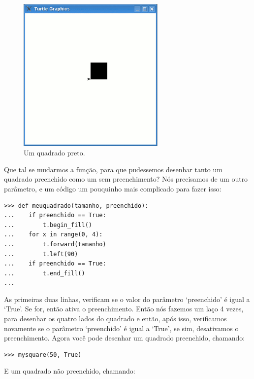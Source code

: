 {\begin{figure}
\begin{center}
\includegraphics[width=72mm]{eps/figure27.eps}
\end{center}
\caption{Um quadrado preto.}\label{fig27}
\end{figure}

Que tal se mudarmos a função, para que pudessemos desenhar tanto um quadrado preenchido como um sem preenchimento? Nós precisamos de um outro parâmetro, e um código um pouquinho mais complicado para fazer isso:

\begin{listing}
\begin{verbatim}
>>> def meuquadrado(tamanho, preenchido):
...    if preenchido == True:
...        t.begin_fill()
...    for x in range(0, 4):
...        t.forward(tamanho)
...        t.left(90)
...    if preenchido == True:
...        t.end_fill()
...
\end{verbatim}
\end{listing}

As primeiras duas linhas, verificam se o valor do parâmetro `preenchido' é igual a `True'. Se for, então ativa o preenchimento. Então nós fazemos um laço 4 vezes, para desenhar os quatro lados do quadrado e então, após isso, verificamos novamente se o parâmetro `preenchido' é igual a `True', se sim, desativamos o preenchimento. Agora você pode desenhar um quadrado preenchido, chamando:

\begin{listing}
\begin{verbatim}
>>> mysquare(50, True)
\end{verbatim}
\end{listing}

\noindent
E um quadrado não preenchido, chamando:

}
